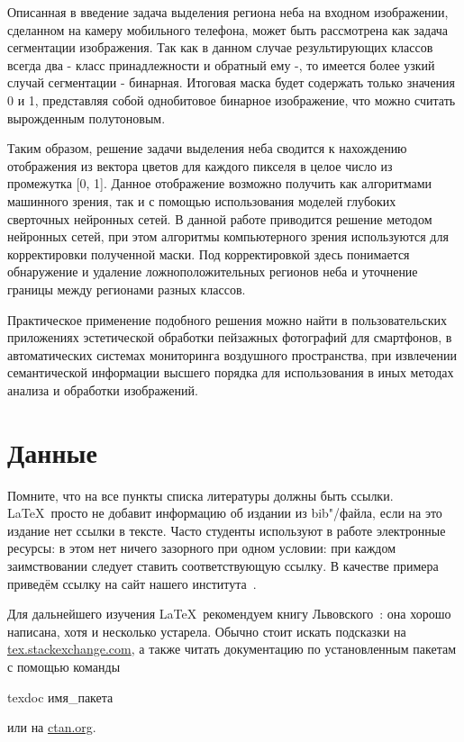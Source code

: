 Описанная в введение задача выделения региона неба на входном изображении, сделанном на камеру мобильного телефона, может быть рассмотрена как задача сегментации изображения. Так как в данном случае результирующих классов всегда два - класс принадлежности и обратный ему -, то имеется более узкий случай сегментации - бинарная. Итоговая маска будет содержать только значения 0 и 1, представляя собой однобитовое бинарное изображение, что можно считать вырожденным полутоновым.

Таким образом, решение задачи выделения неба сводится к нахождению отображения из вектора цветов для каждого пикселя в целое число из промежутка [0, 1]. Данное отображение возможно получить как алгоритмами машинного зрения, так и с помощью использования моделей глубоких сверточных нейронных сетей. В данной работе приводится решение методом нейронных сетей, при этом алгоритмы компьютерного зрения используются для корректировки полученной маски. Под корректировкой здесь понимается обнаружение и удаление ложноположительных регионов неба и уточнение границы между регионами разных классов.

Практическое применение подобного решения можно найти в пользовательских приложениях эстетической обработки пейзажных фотографий для смартфонов, в автоматических системах мониторинга воздушного пространства, при извлечении семантической информации высшего порядка для использования в иных методах анализа и обработки изображений.

\section{Данные}



\Conc

Помните, что на все пункты списка литературы должны быть ссылки. \LaTeX\ просто не добавит информацию об издании из bib"/файла, если на это издание нет ссылки в тексте. Часто студенты используют в работе  электронные ресурсы: в этом нет ничего зазорного при одном условии: при каждом заимствовании следует ставить соответствующую ссылку. В качестве примера приведём ссылку на сайт нашего института~\autocite{mmcs}.

Для дальнейшего изучения \LaTeX\ рекомендуем книгу Львовского~\autocite{Lvo2003}: она хорошо написана, хотя и несколько устарела.
Обычно стоит искать подсказки на
\href{http://tex.stackexchange.com/}{tex.stackexchange.com}, а также
читать документацию по установленным пакетам с помощью
команды
\begin{Verb}
texdoc имя_пакета
\end{Verb}
или на \href{http://ctan.org/}{ctan.org}.

\printbibliography[%
    heading=bibintoc%
]



